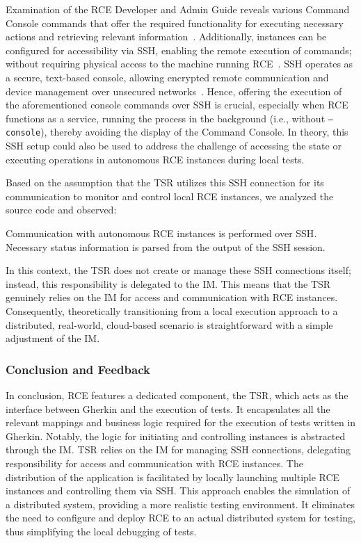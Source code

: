 Examination of the \ac{RCE} Developer and Admin Guide reveals various Command Console commands that offer the required functionality for executing necessary actions and retrieving relevant information~\cite{rceDevGuide10x}. Additionally, instances can be configured for accessibility via \ac{SSH}, enabling the remote execution of commands; without requiring physical access to the machine running RCE~\cite{rceDevGuide10x}. \ac{SSH} operates as a secure, text-based console, allowing encrypted remote communication and device management over unsecured networks~\cite{Schwenk2022}. Hence, offering the execution of the aforementioned console commands over \ac{SSH} is crucial, especially when \ac{RCE} functions as a service, running the process in the background (i.e., without \texttt{--console}), thereby avoiding the display of the Command Console. In theory, this \ac{SSH} setup could also be used to address the challenge of accessing the state or executing operations in autonomous \ac{RCE} instances during local tests.

Based on the assumption that the \ac{TSR} utilizes this \ac{SSH} connection for its communication to monitor and control local \ac{RCE} instances, we analyzed the source code and observed:
\begin{observation}
Communication with autonomous RCE instances is performed over \ac{SSH}. Necessary status information is parsed from the output of the \ac{SSH} session.
\end{observation}
In this context, the \ac{TSR} does not create or manage these \ac{SSH} connections itself; instead, this responsibility is delegated to the \ac{IM}. This means that the \ac{TSR} genuinely relies on the \ac{IM} for access and communication with \ac{RCE} instances. Consequently, theoretically transitioning from a local execution approach to a distributed, real-world, cloud-based scenario is straightforward with a simple adjustment of the \ac{IM}.

\subsubsection{Conclusion and Feedback}
In conclusion, RCE features a dedicated component, the \acf{TSR}, which acts as the interface between Gherkin and the execution of tests. It encapsulates all the relevant mappings and business logic required for the execution of tests written in Gherkin. Notably, the logic for initiating and controlling instances is abstracted through the \acf{IM}. \ac{TSR} relies on the \ac{IM} for managing \ac{SSH} connections, delegating responsibility for access and communication with RCE instances. The distribution of the application is facilitated by locally launching multiple RCE instances and controlling them via \ac{SSH}. This approach enables the simulation of a distributed system, providing a more realistic testing environment. It eliminates the need to configure and deploy RCE to an actual distributed system for testing, thus simplifying the local debugging of tests.

